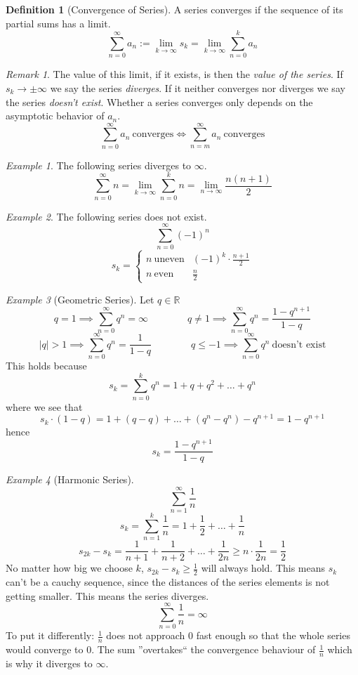 \documentclass[english,titlepage]{uzhpub}
\theoremstyle{definition}
\newtheorem{definition}{Definition}[section]
\theoremstyle{plain}
\theoremstyle{remark}
\newtheorem*{remark}{Remark}
\theoremstyle{example}
\newtheorem*{example}{Example}
\begin{document}
   \begin{definition}[Convergence of Series]\label{def:series_convergence}
      A series converges if the sequence of its partial sums has a limit.
      \[\sum_{n = 0}^{\infty} a_n := \lim_{k \to \infty} s_k = \lim_{k \to \infty} \sum_{n = 0}^k a_n\]
   \end{definition}
   \begin{remark}
      The value of this limit, if it exists, is then the \textit{value of the series}.
      If \(s_k \to \pm\infty\) we say the series \textit{diverges}.
      If it neither converges nor diverges we say the series \textit{doesn't exist}.
      Whether a series converges only depends on the asymptotic behavior of \(a_n\).
      \[\sum_{n = 0}^\infty a_n~\text{converges} \iff \sum_{n = m}^\infty a_n~\text{converges}\]
   \end{remark}
   \begin{example}
      The following series diverges to \(\infty\).
      \[\sum_{n = 0}^\infty n = \lim_{k \to \infty} \sum_{n = 0}^k n = \lim_{n \to \infty} \frac{n(n + 1)}{2}\]
   \end{example}
   \begin{example}
      The following series does not exist.
      \[\sum_{n = 0}^\infty (-1)^n\]
      \[s_k = \begin{cases}
            n~\text{uneven} & (-1)^k \cdot \frac{n + 1}{2}\\
            n~\text{even} & \frac{n}{2}
         \end{cases}
      \]
   \end{example}
   \begin{example}[Geometric Series]
      Let \(q \in \mathbb{R}\)
      \[q = 1 \implies \sum_{n = 0}^\infty q^n = \infty \qquad\qquad q \neq 1 \implies \sum_{n = 0}^\infty q^n = \frac{1-q^{n+1}}{1-q}\]
      \[|q| > 1 \implies \sum_{n = 0}^\infty q^n = \frac{1}{1-q} \qquad\qquad q \leq -1 \implies \sum_{n = 0}^\infty q^n~\text{doesn't exist}\]
      This holds because
      \[s_k = \sum_{n = 0}^k q^n = 1 + q + q^2 + \ldots + q^n\]
      where we see that
      \[s_k \cdot (1 - q) = 1 + (q - q) + \ldots + (q^n - q^n) - q^{n+1} = 1-q^{n+1}\]
      hence
      \[s_k = \frac{1 - q^{n+1}}{1 - q}\]
   \end{example}
   \begin{example}[Harmonic Series]
      \[\sum_{n = 1}^\infty \frac{1}{n}\]
      \[s_k = \sum_{n = 1}^k \frac{1}{n} = 1 + \frac{1}{2} + \ldots + \frac{1}{n}\]
      \[s_{2k} - s_k = \frac{1}{n+1} + \frac{1}{n + 2} + \ldots + \frac{1}{2n} \geq n \cdot \frac{1}{2n} = \frac{1}{2}\]
      No matter how big we choose \(k\), \(s_{2k} - s_k \geq \frac{1}{2}\) will always hold.
      This means \(s_k\) can't be a cauchy sequence, since the distances of the series elements is not getting smaller.
      This means the series diverges.
      \[\sum_{n = 0}^\infty \frac{1}{n} = \infty\]
      To put it differently: \(\frac{1}{n}\) does not approach 0 fast enough so that the whole series would converge to 0.
      The sum ''overtakes`` the convergence behaviour of \(\frac{1}{n}\) which is why it diverges to \(\infty\).
   \end{example}
\end{document}
